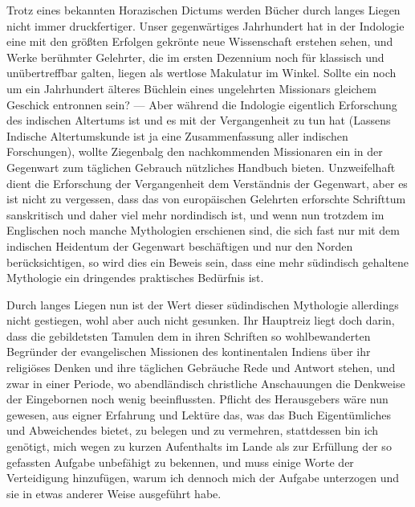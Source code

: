 \documentclass{article}
\begin{document}
Trotz eines bekannten Horazischen Dictums werden Bücher durch langes Liegen nicht immer druckfertiger. Unser gegenwärtiges Jahrhundert hat in der Indologie eine mit den größten Erfolgen gekrönte neue Wissenschaft erstehen sehen, und Werke berühmter Gelehrter, die im ersten Dezennium noch für klassisch und unübertreffbar galten, liegen als wertlose Makulatur im Winkel. Sollte ein noch um ein Jahrhundert älteres Büchlein eines ungelehrten Missionars gleichem Geschick entronnen sein? — Aber während die Indologie eigentlich Erforschung des indischen Altertums ist und es mit der Vergangenheit zu tun hat (Lassens Indische Altertumskunde ist ja eine Zusammenfassung aller indischen Forschungen), wollte Ziegenbalg den nachkommenden Missionaren ein in der Gegenwart zum täglichen Gebrauch nützliches Handbuch bieten. Unzweifelhaft dient die Erforschung der Vergangenheit dem Verständnis der Gegenwart, aber es ist nicht zu vergessen, dass das von europäischen Gelehrten erforschte Schrifttum sanskritisch und daher viel mehr nordindisch ist, und wenn nun trotzdem im Englischen noch manche Mythologien erschienen sind, die sich fast nur mit dem indischen Heidentum der Gegenwart beschäftigen und nur den Norden berücksichtigen, so wird dies ein Beweis sein, dass eine mehr südindisch gehaltene Mythologie ein dringendes praktisches Bedürfnis ist.

Durch langes Liegen nun ist der Wert dieser südindischen Mythologie allerdings nicht gestiegen, wohl aber auch nicht gesunken. Ihr Hauptreiz liegt doch darin, dass die gebildetsten Tamulen dem in ihren Schriften so wohlbewanderten Begründer der evangelischen Missionen des kontinentalen Indiens über ihr religiöses Denken und ihre täglichen Gebräuche Rede und Antwort stehen, und zwar in einer Periode, wo abendländisch christliche Anschauungen die Denkweise der Eingebornen noch wenig beeinflussten. Pflicht des Herausgebers wäre nun gewesen, aus eigner Erfahrung und Lektüre das, was das Buch Eigentümliches und Abweichendes bietet, zu belegen und zu vermehren, stattdessen bin ich genötigt, mich wegen zu kurzen Aufenthalts im Lande als zur Erfüllung der so gefassten Aufgabe unbefähigt zu bekennen, und muss einige Worte der Verteidigung hinzufügen, warum ich dennoch mich der Aufgabe unterzogen und sie in etwas anderer Weise ausgeführt habe.
\end{document}
